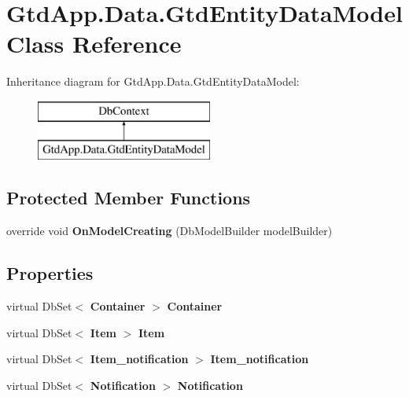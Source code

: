 \section{Gtd\+App.\+Data.\+Gtd\+Entity\+Data\+Model Class Reference}
\label{class_gtd_app_1_1_data_1_1_gtd_entity_data_model}
Inheritance diagram for Gtd\+App.\+Data.\+Gtd\+Entity\+Data\+Model\+:\begin{figure}[H]
\begin{center}
\leavevmode
\includegraphics[height=2.000000cm]{class_gtd_app_1_1_data_1_1_gtd_entity_data_model}
\end{center}
\end{figure}
\subsection*{Protected Member Functions}
\begin{DoxyCompactItemize}
\item 
\mbox{\label{class_gtd_app_1_1_data_1_1_gtd_entity_data_model_a3ce1991202dd560d6e677d632ed3f411}} 
override void {\bfseries On\+Model\+Creating} (Db\+Model\+Builder model\+Builder)
\end{DoxyCompactItemize}
\subsection*{Properties}
\begin{DoxyCompactItemize}
\item 
\mbox{\label{class_gtd_app_1_1_data_1_1_gtd_entity_data_model_a641256f630f42908cff207e277f823ec}} 
virtual Db\+Set$<$ \textbf{ Container} $>$ {\bfseries Container}\hspace{0.3cm}{\ttfamily  [get, set]}
\item 
\mbox{\label{class_gtd_app_1_1_data_1_1_gtd_entity_data_model_a0f86eefb8da656d296b2df21b99a51c6}} 
virtual Db\+Set$<$ \textbf{ Item} $>$ {\bfseries Item}\hspace{0.3cm}{\ttfamily  [get, set]}
\item 
\mbox{\label{class_gtd_app_1_1_data_1_1_gtd_entity_data_model_adfb7d21c062e4c7d8de115b9e649277b}} 
virtual Db\+Set$<$ \textbf{ Item\+\_\+notification} $>$ {\bfseries Item\+\_\+notification}\hspace{0.3cm}{\ttfamily  [get, set]}
\item 
\mbox{\label{class_gtd_app_1_1_data_1_1_gtd_entity_data_model_ae15929d92f723e2d23ca6959d2e1c1d6}} 
virtual Db\+Set$<$ \textbf{ Notification} $>$ {\bfseries Notification}\hspace{0.3cm}{\ttfamily  [get, set]}
\end{DoxyCompactItemize}


